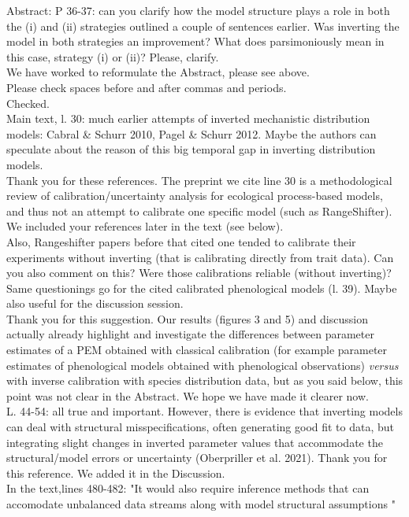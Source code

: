 \documentclass[a4paper, 11pt]{article}
\begin{document}
\noindent Abstract: P 36-37: can you clarify how the model structure plays a role in both the (i) and (ii) strategies outlined a couple of sentences earlier. Was inverting the model in both strategies an improvement? What does parsimoniously mean in this case, strategy (i) or (ii)? Please, clarify.\\
\textcolor{customblue}{We have worked to reformulate the Abstract, please see above.}\\

\noindent Please check spaces before and after commas and periods.\\
\textcolor{customblue}{Checked.}\\

\noindent Main text, l. 30: much earlier attempts of inverted mechanistic distribution models:
Cabral \& Schurr 2010, Pagel \& Schurr 2012. Maybe the authors can speculate about the reason of this big temporal gap in inverting distribution models.\\
\textcolor{customblue}{Thank you for these references. The preprint we cite line 30 is a methodological review of calibration/uncertainty analysis for ecological process-based models, and thus not an attempt to calibrate one specific model (such as RangeShifter). We included your references later in the text (see below).}\\

\clearpage
\noindent Also, Rangeshifter papers before that cited one tended to calibrate their experiments without inverting (that is calibrating directly from trait data). Can you also comment on this? Were those calibrations reliable (without inverting)? Same questionings go for the cited calibrated phenological models (l. 39). Maybe also useful for the discussion session.\\
\textcolor{customblue}{Thank you for this suggestion. Our results (figures 3 and 5) and discussion actually already highlight and investigate the differences between parameter estimates of a PEM obtained with classical calibration (for example parameter estimates of phenological models obtained with phenological observations) \textit{versus} with inverse calibration with species distribution data, but as you said below, this point was not clear in the Abstract. We hope we have made it clearer now.}\\

\noindent L. 44-54: all true and important. However, there is evidence that inverting models can deal with structural misspecifications, often generating good fit to data, but integrating slight changes in inverted parameter values that accommodate the structural/model errors or uncertainty (Oberpriller et al. 2021). 
\textcolor{customblue}{Thank you for this reference. We added it in the Discussion.}\\
In the text,lines 480-482: \textcolor{customred}{"It would also require inference methods that can accomodate unbalanced data streams along with model structural assumptions \citep{Oberpriller2021}"}\\
\end{document}
